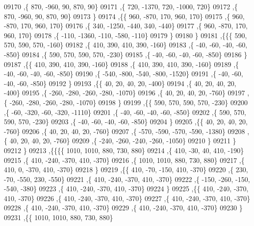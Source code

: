 \begin{DoxyCode}
09170     ,\{   870,  -960,    90,   870,    90\}
09171     ,\{   720, -1370,   720, -1000,   720\}
09172     ,\{   870,  -960,    90,   870,    90\}
09173     \}
09174    ,\{\{   960,  -870,   170,   960,   170\}
09175     ,\{   960,  -870,   170,   960,   170\}
09176     ,\{   340, -1250,  -440,   340,  -440\}
09177     ,\{   960,  -870,   170,   960,   170\}
09178     ,\{  -110, -1360,  -110,  -580,  -110\}
09179     \}
09180    \}
09181   ,\{\{\{   590,   570,   590,   570,  -160\}
09182     ,\{   410,   390,   410,   390,  -160\}
09183     ,\{   -40,   -60,   -40,   -60,  -850\}
09184     ,\{   590,   570,   590,   570,  -230\}
09185     ,\{   -40,   -60,   -40,   -60,  -850\}
09186     \}
09187    ,\{\{   410,   390,   410,   390,  -160\}
09188     ,\{   410,   390,   410,   390,  -160\}
09189     ,\{   -40,   -60,   -40,   -60,  -850\}
09190     ,\{  -540,  -800,  -540,  -800, -1520\}
09191     ,\{   -40,   -60,   -40,   -60,  -850\}
09192     \}
09193    ,\{\{    40,    20,    40,    20,  -400\}
09194     ,\{    40,    20,    40,    20,  -400\}
09195     ,\{  -260,  -280,  -260,  -280, -1070\}
09196     ,\{    40,    20,    40,    20,  -760\}
09197     ,\{  -260,  -280,  -260,  -280, -1070\}
09198     \}
09199    ,\{\{   590,   570,   590,   570,  -230\}
09200     ,\{   -60,  -320,   -60,  -320, -1110\}
09201     ,\{   -40,   -60,   -40,   -60,  -850\}
09202     ,\{   590,   570,   590,   570,  -230\}
09203     ,\{   -40,   -60,   -40,   -60,  -850\}
09204     \}
09205    ,\{\{    40,    20,    40,    20,  -760\}
09206     ,\{    40,    20,    40,    20,  -760\}
09207     ,\{  -570,  -590,  -570,  -590, -1380\}
09208     ,\{    40,    20,    40,    20,  -760\}
09209     ,\{  -240,  -260,  -240,  -260, -1050\}
09210     \}
09211    \}
09212   \}
09213  ,\{\{\{\{  1010,  1010,   880,   730,   880\}
09214     ,\{   410,   -30,    40,   410,  -190\}
09215     ,\{   410,  -240,  -370,   410,  -370\}
09216     ,\{  1010,  1010,   880,   730,   880\}
09217     ,\{   410,     0,  -370,   410,  -370\}
09218     \}
09219    ,\{\{   410,   -70,  -150,   410,  -370\}
09220     ,\{   230,   -70,  -550,   230,  -550\}
09221     ,\{   410,  -240,  -370,   410,  -370\}
09222     ,\{  -150,  -260,  -150,  -540,  -380\}
09223     ,\{   410,  -240,  -370,   410,  -370\}
09224     \}
09225    ,\{\{   410,  -240,  -370,   410,  -370\}
09226     ,\{   410,  -240,  -370,   410,  -370\}
09227     ,\{   410,  -240,  -370,   410,  -370\}
09228     ,\{   410,  -240,  -370,   410,  -370\}
09229     ,\{   410,  -240,  -370,   410,  -370\}
09230     \}
09231    ,\{\{  1010,  1010,   880,   730,   880\}

\end{DoxyCode}
